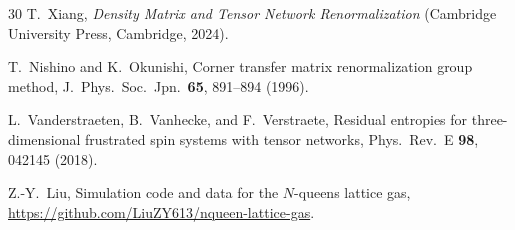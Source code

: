 \documentclass[aps, pre, reprint, amsmath, amssymb, superscriptaddress, floatfix]{revtex4-2}
\begin{document}
\begin{thebibliography}{30}
T.~Xiang,
\textit{Density Matrix and Tensor Network Renormalization}
(Cambridge University Press, Cambridge, 2024).

T.~Nishino and K.~Okunishi,
Corner transfer matrix renormalization group method,
J.~Phys.\ Soc.\ Jpn.\ \textbf{65}, 891--894 (1996).

L.~Vanderstraeten, B.~Vanhecke, and F.~Verstraete,
Residual entropies for three-dimensional frustrated spin systems with
tensor networks,
Phys.\ Rev.\ E \textbf{98}, 042145 (2018).

Z.-Y.~Liu,
Simulation code and data for the $N$-queens lattice gas,
\url{https://github.com/LiuZY613/nqueen-lattice-gas}.

\end{thebibliography}
\end{document}
